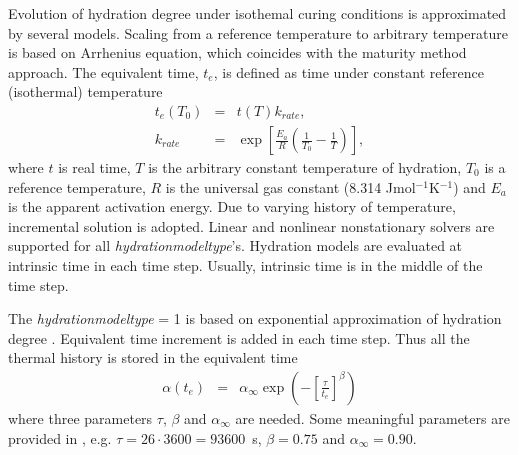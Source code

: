 \documentclass[a4paper]{article}
\newcommand{\param}[1]{{\it #1}}
\newcommand{\ud}{\mathrm{d}}
\begin{document}
Evolution of hydration degree under isothemal curing conditions is approximated by several models. Scaling from a reference temperature to arbitrary temperature is based on Arrhenius equation, which coincides with the maturity method approach. The equivalent time, $t_e$, is defined as time under constant reference (isothermal) temperature
\begin{eqnarray}
t_e(T_0)&=&t(T) k_{rate},\\
k_{rate}&=&\exp\left[\frac{E_a}{R}\left(\frac{1}{T_0}-\frac{1}{T}\right)\right],
\end{eqnarray}
where $t$ is real time, $T$ is the arbitrary constant temperature of hydration, $T_0$ is a reference temperature, $R$ is the universal gas constant (8.314 Jmol$^{-1}$K$^{-1}$) and $E_a$ is the apparent activation energy. Due to varying history of temperature, incremental solution is adopted. Linear and nonlinear nonstationary solvers are supported for all \param{hydrationmodeltype}'s. Hydration models are evaluated at intrinsic time in each time step. Usually, intrinsic time is in the middle of the time step.

The \param{hydrationmodeltype} = 1 is based on exponential approximation of hydration degree \cite{Schindler:2005}. Equivalent time increment is added in each time step. Thus all the thermal history is stored in the equivalent time
\begin{eqnarray}
\alpha(t_e) &=& \alpha_\infty \exp\left(-\left[\frac{\tau}{t_e} \right]^\beta \right)\label{eq:affinity1}
\end{eqnarray}
where three parameters $\tau$, $\beta$ and $\alpha_\infty$ are needed. Some meaningful parameters are provided in \cite{Schindler:2005}, e.g. $\tau=26\cdot3600=93600$~s, $\beta=0.75$ and $\alpha_\infty=0.90$.
\end{document}
